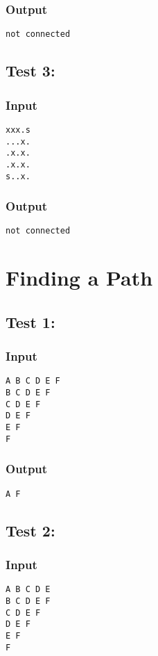 \documentclass[twocolumn]{extarticle}
\begin{document}
\subsubsection*{Output}
\texttt{not connected}

\subsection*{Test 3:}
\subsubsection*{Input}
\texttt{xxx.s\\
...x.\\
.x.x.\\
.x.x.\\
s..x.}

\subsubsection*{Output}
\texttt{not connected}

\newpage
\section{Finding a Path}
\subsection*{Test 1:}
\subsubsection*{Input}
\texttt{A B C D E F\\
B C D E F\\
C D E F\\
D E F\\
E F\\
F}

\subsubsection*{Output}
\texttt{A F}

\subsection*{Test 2:}
\subsubsection*{Input}
\texttt{A B C D E\\
B C D E F\\
C D E F\\
D E F\\
E F\\
F}
\end{document}
